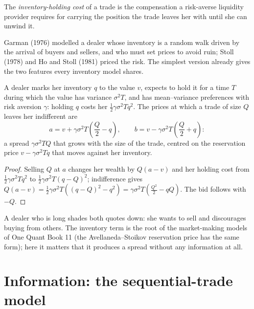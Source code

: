 \begin{definition}\label{def:mx:why-there-is-a-spread:inventory}
The \emph{inventory-holding cost} of a trade is the compensation a risk-averse liquidity provider requires for carrying
the position the trade leaves her with until she can unwind it.
\end{definition}

Garman (1976) modelled a dealer whose inventory is a random walk driven by the arrival of buyers and sellers, and who must set prices to avoid ruin;
Stoll (1978) and Ho and Stoll (1981) priced the risk. The simplest version already gives the two features every inventory model shares.

\begin{proposition}\label{prop:mx:why-there-is-a-spread:inventory}
A dealer marks her inventory $q$ to the value $v$, expects to hold it for a time $T$ during which the value has variance $\sigma^2T$, and has mean--variance
preferences with risk aversion $\gamma$: holding $q$ costs her $\tfrac12\gamma\sigma^2Tq^2$. The prices at which a trade of size $Q$ leaves her indifferent
are
\[
a = v + \gamma\sigma^2T\left(\frac Q2 - q\right),\qquad b = v - \gamma\sigma^2T\left(\frac Q2 + q\right):
\]
a spread $\gamma\sigma^2TQ$ that grows with the size of the trade, centred on the reservation price $v-\gamma\sigma^2Tq$ that moves against her inventory.
\end{proposition}

\begin{proof}
Selling $Q$ at $a$ changes her wealth by $Q(a-v)$ and her holding cost from $\tfrac12\gamma\sigma^2Tq^2$ to $\tfrac12\gamma\sigma^2T(q-Q)^2$;
indifference gives $Q(a-v)=\tfrac12\gamma\sigma^2T\left((q-Q)^2-q^2\right)=\gamma\sigma^2T\left(\tfrac{Q^2}{2}-qQ\right)$. The bid follows with $-Q$.
\end{proof}

A dealer who is long shades both quotes down: she wants to sell and discourages buying from others. The inventory term is the root of the market-making
models of One Quant Book 11 (the Avellaneda--Stoikov reservation price has the same form); here it matters that it produces a spread without any
information at all.

\section{Information: the sequential-trade model}

